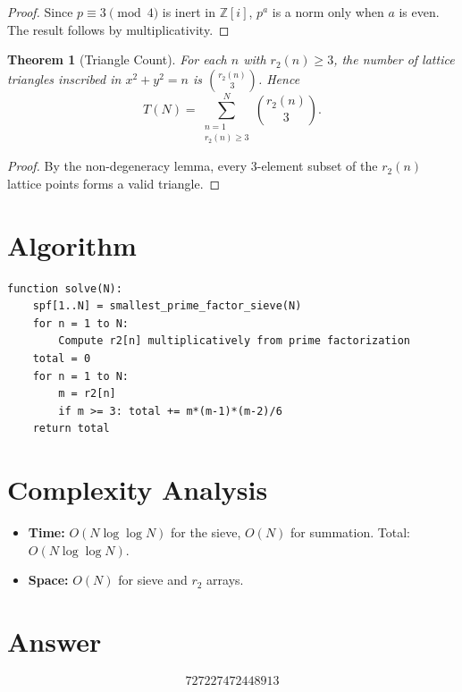 \documentclass[12pt]{article}
\newtheorem{theorem}{Theorem}
\begin{document}
\begin{proof}
Since $p\equiv 3\pmod{4}$ is inert in $\mathbb{Z}[i]$, $p^a$ is a norm only when $a$ is even. The result follows by multiplicativity.
\end{proof}

\begin{theorem}[Triangle Count]
For each $n$ with $r_2(n) \ge 3$, the number of lattice triangles inscribed in $x^2+y^2=n$ is $\binom{r_2(n)}{3}$. Hence
\[
T(N) = \sum_{\substack{n=1\\r_2(n)\ge 3}}^{N}\binom{r_2(n)}{3}.
\]
\end{theorem}

\begin{proof}
By the non-degeneracy lemma, every 3-element subset of the $r_2(n)$ lattice points forms a valid triangle.
\end{proof}

\section{Algorithm}

\begin{verbatim}
function solve(N):
    spf[1..N] = smallest_prime_factor_sieve(N)
    for n = 1 to N:
        Compute r2[n] multiplicatively from prime factorization
    total = 0
    for n = 1 to N:
        m = r2[n]
        if m >= 3: total += m*(m-1)*(m-2)/6
    return total
\end{verbatim}

\section{Complexity Analysis}

\begin{itemize}
\item \textbf{Time:} $O(N\log\log N)$ for the sieve, $O(N)$ for summation. Total: $O(N\log\log N)$.
\item \textbf{Space:} $O(N)$ for sieve and $r_2$ arrays.
\end{itemize}

\section{Answer}

\[
\boxed{727227472448913}
\]
\end{document}
